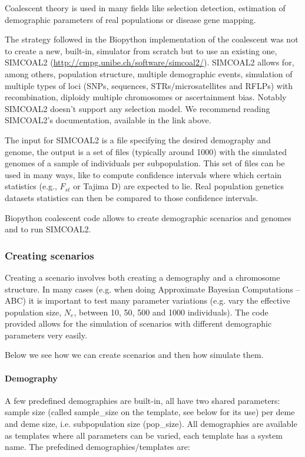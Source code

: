 \documentclass{report}
\begin{document}
Coalescent theory is used in many fields like selection detection, estimation of
demographic parameters of real populations or disease gene mapping.

The strategy followed in the Biopython implementation of the coalescent was not
to create a new, built-in, simulator from scratch but to use an existing one,
SIMCOAL2 (\url{http://cmpg.unibe.ch/software/simcoal2/}). SIMCOAL2 allows for,
among others, population structure, multiple demographic events, simulation
of multiple types of loci (SNPs, sequences, STRs/microsatellites and RFLPs)
with recombination, diploidy multiple chromosomes or ascertainment bias. Notably
SIMCOAL2 doesn't support any selection model. We recommend reading SIMCOAL2's
documentation, available in the link above.

The input for SIMCOAL2 is a file specifying the desired demography and genome,
the output is a set of files (typically around 1000) with the simulated genomes
of a sample of individuals per subpopulation. This set of files can be used
in many ways, like to compute confidence intervals where which certain
statistics (e.g., $F_{st}$ or Tajima D) are expected to lie. Real population
genetics datasets statistics can then be compared to those confidence intervals.

Biopython coalescent code allows to create demographic scenarios and genomes and
to run SIMCOAL2.

\subsubsection{Creating scenarios}

Creating a scenario involves both creating a demography and a chromosome structure.
In many cases (e.g. when doing Approximate Bayesian Computations -- ABC) it is
important to test many parameter variations (e.g. vary the effective population size,
$N_e$, between 10, 50, 500 and 1000 individuals). The code provided allows for
the simulation of scenarios with different demographic parameters very easily.

Below we see how we can create scenarios and then how simulate them.

\paragraph{Demography}

A few predefined demographies are built-in, all have two shared parameters: sample size
(called sample\_size on the template, see below for its use) per deme and deme size, i.e.
subpopulation size (pop\_size). All demographies are available as templates where all
parameters can be varied, each template has a system name. The prefedined
demographies/templates are:
\end{document}
